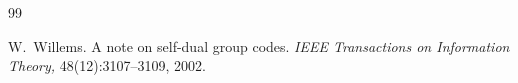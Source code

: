 \documentclass[11pt]{article}
\begin{document}
\begin{thebibliography}{99}


 {\sc W.~Willems.}
A note on self-dual group codes.
\emph{IEEE Transactions on Information Theory,}
48(12):3107--3109, 2002.


\end{thebibliography}
\end{document}
